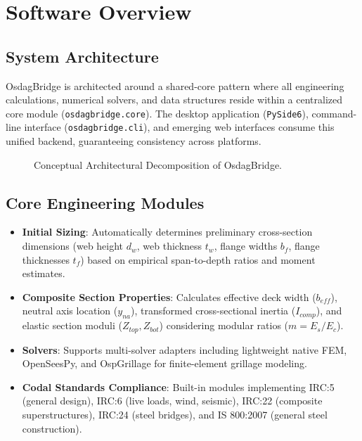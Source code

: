 \chapter{Software Overview}
\label{chap:software_overview}

\section{System Architecture}
OsdagBridge is architected around a shared-core pattern where all engineering calculations, numerical solvers, and data structures reside within a centralized core module (\texttt{osdagbridge.core}). The desktop application (\texttt{PySide6}), command-line interface (\texttt{osdagbridge.cli}), and emerging web interfaces consume this unified backend, guaranteeing consistency across platforms.

\begin{figure}[htbp]
    \centering
    \caption{Conceptual Architectural Decomposition of OsdagBridge.}
    \label{fig:arch_overview}
\end{figure}

\section{Core Engineering Modules}
\begin{itemize}
    \item \textbf{Initial Sizing}: Automatically determines preliminary cross-section dimensions (web height $d_w$, web thickness $t_w$, flange widths $b_f$, flange thicknesses $t_f$) based on empirical span-to-depth ratios and moment estimates.
    \item \textbf{Composite Section Properties}: Calculates effective deck width ($b_{eff}$), neutral axis location ($y_{na}$), transformed cross-sectional inertia ($I_{comp}$), and elastic section moduli ($Z_{top}, Z_{bot}$) considering modular ratios ($m = E_s / E_c$).
    \item \textbf{Solvers}: Supports multi-solver adapters including lightweight native FEM, OpenSeesPy, and OspGrillage for finite-element grillage modeling.
    \item \textbf{Codal Standards Compliance}: Built-in modules implementing IRC:5 (general design), IRC:6 (live loads, wind, seismic), IRC:22 (composite superstructures), IRC:24 (steel bridges), and IS 800:2007 (general steel construction).
\end{itemize}

